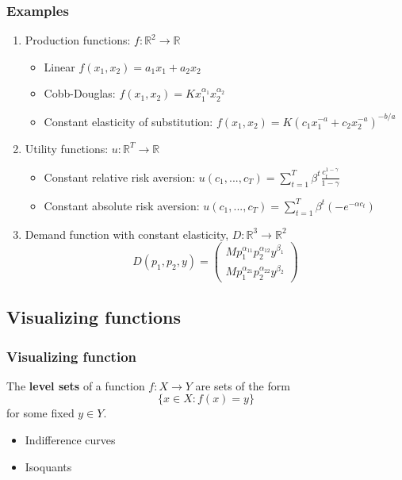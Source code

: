 \documentclass[compress]{beamer}
\def\R{\mathbb{R}}
\renewcommand{\to}{{\rightarrow}}
\begin{document}
\begin{frame}[shrink]
  \frametitle{Examples}
  \begin{enumerate}
  \item Production functions: $f:\R^2 \to \R$ 
    \begin{itemize}
    \item Linear $ f(x_1,x_2) = a_1 x_1 + a_2 x_2 $
    \item Cobb-Douglas: $f(x_1,x_2) = K x_1^{\alpha_1} x_2^{\alpha_2}$
    \item Constant elasticity of substitution: $f(x_1,x_2) = K (c_1
      x_1^{-a} + c_2 x_2^{-a})^{-b/a}$
    \end{itemize}
  \item Utility functions: $u: \R^T \to \R$
    \begin{itemize}
    \item Constant relative risk aversion: $u(c_1,...,c_T) =
      \sum_{t=1}^T \beta^t \frac{c_t^{1-\gamma}}{1-\gamma}$
    \item Constant absolute risk aversion: $u(c_1,...,c_T) =
      \sum_{t=1}^T \beta^t (-e^{-\alpha c_t})$
    \end{itemize}
  \item Demand function with constant elasticity,  $D:\R^3 \to \R^2$
    \[ D(p_1,p_2,y) = \begin{pmatrix} M p_1^{\alpha_{11}}
      p_2^{\alpha_{12}} y^{\beta_1} \\
      M p_1^{\alpha_{21}} p_2^{\alpha_{22}} y^{\beta_2}
    \end{pmatrix}
    \]
  \end{enumerate}
\end{frame}

\subsection{Visualizing functions}
\begin{frame}
  \frametitle{Visualizing function}
  \begin{definition}
    The \textbf{level sets} of a function $f:X\to Y$ are sets of the
    form 
    \[ \{ x \in X: f(x) = y \} \]
    for some fixed $y \in Y$.
  \end{definition}
  \begin{itemize}
  \item Indifference curves
  \item Isoquants
  \end{itemize}
\end{frame}
\end{document}
